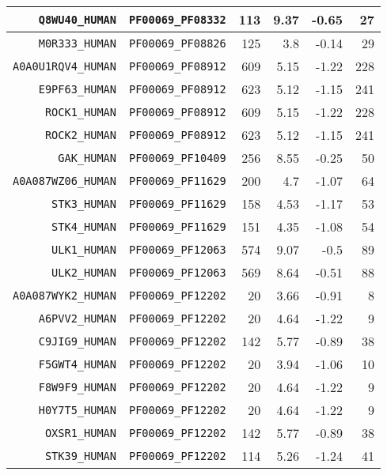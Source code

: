 \begin{longtable}[c]{||r|r|r|r|r|r||}
  \texttt{Q8WU40\_HUMAN} & \texttt{PF00069\_PF08332} & 113 & 9.37 & -0.65 & 27 \\
  \hline
  \texttt{M0R333\_HUMAN} & \texttt{PF00069\_PF08826} & 125 & 3.8 & -0.14 & 29 \\
  \hline
  \texttt{A0A0U1RQV4\_HUMAN} & \texttt{PF00069\_PF08912} & 609 & 5.15 & -1.22 & 228 \\
  \hline
  \texttt{E9PF63\_HUMAN} & \texttt{PF00069\_PF08912} & 623 & 5.12 & -1.15 & 241 \\
  \hline
  \texttt{ROCK1\_HUMAN} & \texttt{PF00069\_PF08912} & 609 & 5.15 & -1.22 & 228 \\
  \hline
  \texttt{ROCK2\_HUMAN} & \texttt{PF00069\_PF08912} & 623 & 5.12 & -1.15 & 241 \\
  \hline
  \texttt{GAK\_HUMAN} & \texttt{PF00069\_PF10409} & 256 & 8.55 & -0.25 & 50 \\
  \hline
  \texttt{A0A087WZ06\_HUMAN} & \texttt{PF00069\_PF11629} & 200 & 4.7 & -1.07 & 64 \\
  \hline
  \texttt{STK3\_HUMAN} & \texttt{PF00069\_PF11629} & 158 & 4.53 & -1.17 & 53 \\
  \hline
  \texttt{STK4\_HUMAN} & \texttt{PF00069\_PF11629} & 151 & 4.35 & -1.08 & 54 \\
  \hline
  \texttt{ULK1\_HUMAN} & \texttt{PF00069\_PF12063} & 574 & 9.07 & -0.5 & 89 \\
  \hline
  \texttt{ULK2\_HUMAN} & \texttt{PF00069\_PF12063} & 569 & 8.64 & -0.51 & 88 \\
  \hline
  \texttt{A0A087WYK2\_HUMAN} & \texttt{PF00069\_PF12202} & 20 & 3.66 & -0.91 & 8 \\
  \hline
  \texttt{A6PVV2\_HUMAN} & \texttt{PF00069\_PF12202} & 20 & 4.64 & -1.22 & 9 \\
  \hline
  \texttt{C9JIG9\_HUMAN} & \texttt{PF00069\_PF12202} & 142 & 5.77 & -0.89 & 38 \\
  \hline
  \texttt{F5GWT4\_HUMAN} & \texttt{PF00069\_PF12202} & 20 & 3.94 & -1.06 & 10 \\
  \hline
  \texttt{F8W9F9\_HUMAN} & \texttt{PF00069\_PF12202} & 20 & 4.64 & -1.22 & 9 \\
  \hline
  \texttt{H0Y7T5\_HUMAN} & \texttt{PF00069\_PF12202} & 20 & 4.64 & -1.22 & 9 \\
  \hline
  \texttt{OXSR1\_HUMAN} & \texttt{PF00069\_PF12202} & 142 & 5.77 & -0.89 & 38 \\
  \hline
  \texttt{STK39\_HUMAN} & \texttt{PF00069\_PF12202} & 114 & 5.26 & -1.24 & 41 \\

\end{longtable}
